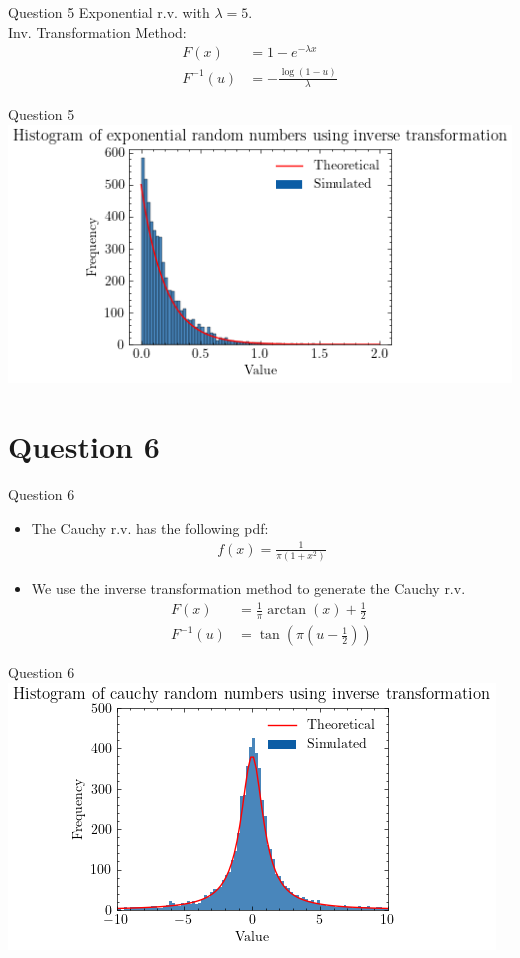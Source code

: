 \documentclass[compress,12pt]{beamer}
\begin{document}
\begin{frame}{Question 5}
      Exponential r.v. with $\lambda = 5$. \\
      Inv. Transformation Method:
      \begin{align*}
            F(x) &= 1 - e^{-\lambda x} \\
            F^{-1}(u) &= -\frac{\log(1-u)}{\lambda}
      \end{align*}

\end{frame}
\begin{frame}{Question 5}
\centering
\includegraphics[scale=0.7]{imgs/exprv.png}
\end{frame}

\section{Question 6}
\begin{frame}{Question 6}
\begin{itemize}
    \item The Cauchy r.v. has the following pdf:
    \begin{align*}
        f(x) = \frac{1}{\pi(1+x^2)}
    \end{align*}
    \item We use the inverse transformation method to generate the Cauchy r.v.
    \begin{align*}
        F(x) &= \frac{1}{\pi} \arctan(x) + \frac{1}{2} \\
        F^{-1}(u) &= \tan(\pi(u - \frac{1}{2}))
    \end{align*}
\end{itemize}

\end{frame}
\begin{frame}{Question 6}
\centering
\includegraphics[scale=0.7]{imgs/cauchyrv.png}
\end{frame}
\end{document}
